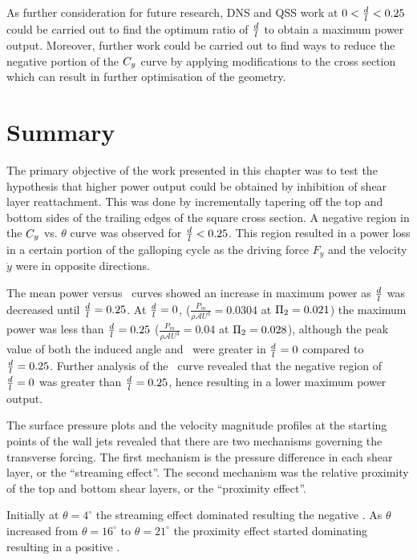   As further consideration for future research, DNS and QSS work at $0<\frac{d}{l}<0.25$ could be carried out to find the optimum ratio of $\frac{d}{l}$ to obtain a maximum power output. Moreover, further work could be carried out to find ways to reduce the negative portion of the $C_{y}$ curve by applying modifications to the cross section which can result in further optimisation of the geometry.
 
 \section{Summary} 
 \label{sec:summary-diff-cross-sec}
 
 The primary objective of the work presented in this chapter was to test the hypothesis that higher power output could be obtained by inhibition of shear layer reattachment. This was done by incrementally tapering off the top and bottom sides of the trailing edges of the square cross section. A negative region in the $C_{y}$ vs. $\theta$ curve was observed for $\frac{d}{l}<0.25$. This region resulted in a power loss in a certain portion of the galloping cycle as the driving force $F_y$ and the velocity $\dot{y}$ were in opposite directions.
 
 The mean power versus \massdamp\ curves showed an increase in maximum power as $\frac{d}{l}$ was decreased until $\frac{d}{l}=0.25$. At $\frac{d}{l}=0$,  ($\displaystyle\frac{P_{m}}{\rho \mathcal{A}U^3}=0.0304$ at $\Pi_2=0.021$) the maximum power was less than $\frac{d}{l}=0.25$ ($\displaystyle\frac{P_{m}}{\rho \mathcal{A}U^3}=0.04$ at $\Pi_2=0.028$), although the peak value of both the induced angle and \cy\ were greater in $\frac{d}{l}=0$ compared to $\frac{d}{l}=0.25$. Further analysis of the \cy\ curve revealed that the negative region of $\frac{d}{l}=0$  was greater than $\frac{d}{l}=0.25$, hence resulting in a lower maximum power output. 
 
 The surface pressure plots and the velocity magnitude profiles at the starting points of the wall jets revealed  that there are two mechanisms governing the transverse forcing. The first mechanism is the pressure difference in each shear layer, or the ``streaming effect''. The second mechanism was the relative proximity of the top and bottom shear layers, or the ``proximity effect''.

 Initially at $\theta= 4^{\circ}$ the streaming effect dominated resulting the negative \cy. As $\theta$ increased from  $\theta= 16^{\circ}$ to  $\theta= 21^{\circ}$ the proximity effect started dominating resulting in a positive \cy.
 
